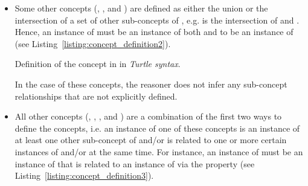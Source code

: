 \begin{itemize}
  \item Some other concepts (, , and ) are defined as either the union or the intersection of a set of other sub-concepts of , e.g.  is the intersection of  and . Hence, an instance of  must be an instance of both  and  to be an instance of  (see Listing~\ref{listing:concept_definition2}).
  
\begin{mintlisting}

\caption[Definition of the concept ]{Definition of the concept  in \smarthomeweather in \emph{Turtle syntax}.}
\label{listing:concept_definition2}
\end{mintlisting}
  
  In the case of these concepts, the  reasoner does not infer any sub-concept relationships that are not explicitly defined.
  
  \item All other concepts (, , , and ) are a combination of the first two ways to define the concepts, i.e. an instance of one of these concepts is an instance of at least one other sub-concept of  and/or is related to one or more certain instances of  and/or  at the same time. For instance, an instance of  must be an instance of  that is related to an instance of  via the property  (see Listing~\ref{listing:concept_definition3}).
  

\end{itemize}
